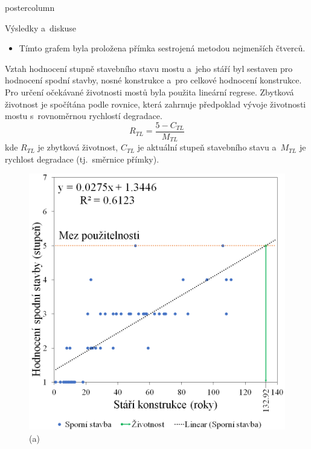 \documentclass{beamer}
\begin{document}
\begin{frame}
\begin{columns}
\begin{column}{.60\textwidth}
\begin{beamercolorbox}[center]{postercolumn}
\begin{minipage}{.98\textwidth}
{\begin{myblock}{Výsledky a~diskuse}
\begin{itemize}
							\item Tímto grafem byla proložena přímka sestrojená metodou nejmenších čtverců.
						\end{itemize}
						\vskip 1cm
						Vztah hodnocení stupně stavebního stavu mostu a~jeho stáří byl sestaven pro hodnocení spodní stavby, nosné konstrukce a~pro celkové hodnocení konstrukce. Pro určení očekávané životnosti mostů byla použita lineární regrese. Zbytková životnost je spočítána podle rovnice, která zahrnuje předpoklad vývoje životnosti mostu s~rovnoměrnou rychlostí degradace.
						\vskip 0.1cm
						\begin{equation*}
							R_{TL} = \frac{5 - C_{TL}}{M_{TL}}
						\end{equation*}
						\vskip 0.5cm
						kde $ R_{TL} $ je zbytková životnost, $ C_{TL} $ je aktuální stupeň stavebního stavu a~$ M_{TL} $ je rychlost degradace (tj.~směrnice přímky).
						\vskip 1cm
						\begin{figure}
							\begin{minipage}{0.30\textwidth}
								\centering\includegraphics[width=1\textwidth]{img/3a}
								\caption*{(a)}
							\end{minipage}
							\hspace{1em}
							\begin{minipage}{0.30\textwidth}

\end{minipage}
\end{figure}
\end{myblock}}
\end{minipage}
\end{beamercolorbox}
\end{column}
\end{columns}
\end{frame}
\end{document}
